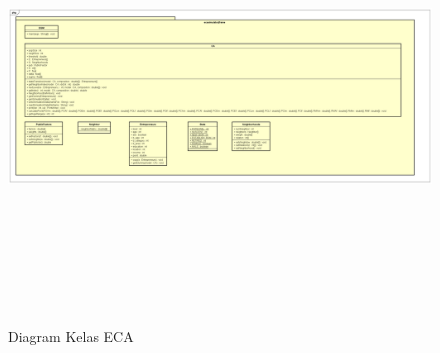 	\begin{figure} [H]
		\centering  
		\includegraphics[width=18cm, height=12cm]{ClassDiagram1} 
		\caption[Diagram Kelas ECA]{Diagram Kelas ECA} 
		\label{fig:CD1} 
	\end{figure}
	
